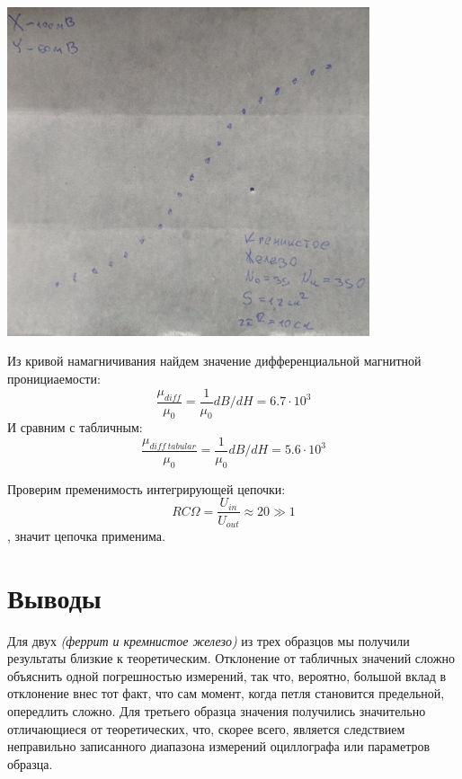 \documentclass[12pt]{article}
\begin{document}
\begin{minipage}{0.5\textwidth}
\begin{center}
    \includegraphics[width=0.8\textwidth]{iron.jpg}
    \label{fer}
\end{center}
\end{minipage}
\begin{minipage}{0.5\textwidth}
Из кривой намагничивания найдем значение дифференциальной магнитной пронициаемости:
    \begin{equation*}
        \frac{\mu_{diff}}{\mu_0} = \frac{1}{\mu_0}dB/dH = 6.7 \cdot 10^3
    \end{equation*}
И сравним с табличным:
    \begin{equation*}
        \frac{\mu_{diff \: tabular}}{\mu_0} = \frac{1}{\mu_0}dB/dH = 5.6 \cdot 10^3
    \end{equation*}
\end{minipage}

Проверим пременимость интегрирующей цепочки:
\begin{equation*}
    RC\Omega = \frac{U_{in}}{U_{out}} \approx 20 \gg 1
\end{equation*}
, значит цепочка применима. 

\section{Выводы}
Для двух \textit{(феррит и кремнистое железо)} из трех образцов мы получили результаты близкие к теоретическим. Отклонение от табличных значений сложно объяснить одной погрешностью измерений, так что, вероятно, большой вклад в отклонение внес тот факт, что сам момент, когда петля становится предельной, опередлить сложно. Для третьего образца значения получились значительно отличающиеся от теоретических, что, скорее всего, является следствием неправильно записанного диапазона измерений оциллографа или параметров образца.
\end{document}
